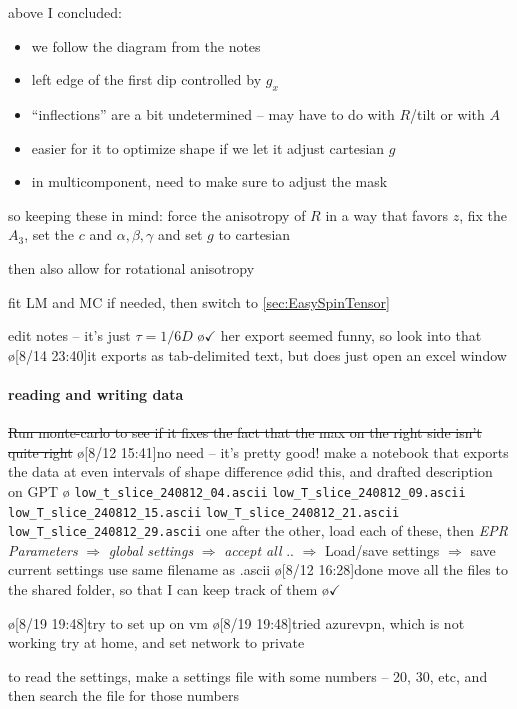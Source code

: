 above I concluded:
\begin{itemize}
    \item we follow the diagram from the notes
    \item left edge of the first dip controlled by $g_x$
    \item ``inflections'' are a bit undetermined -- may have to do with $R$/tilt or with $A$
    \item easier for it to optimize shape if we let it adjust cartesian $g$
    \item in multicomponent, need to make sure to adjust the mask
\end{itemize}
so keeping these in mind:
force the anisotropy of $R$ in a way that favors $z$,
fix the $A_3$,
set the $c$ and $\alpha,\beta,\gamma$
and set $g$ to cartesian

then also allow for rotational anisotropy

fit LM and MC if needed, then switch to \cref{sec:EasySpinTensor}

edit notes -- it's just $\tau=1/6D$
\o{$\checkmark$}
her export seemed funny, so look into that
\o[8/14 23:40]{it exports as tab-delimited text, but does just open an excel window}

\paragraph{reading and writing data}
\sout{Run monte-carlo to see if it fixes the fact that the max on the right side isn't quite right}
\o[8/12 15:41]{no need -- it's pretty good!}
make a notebook that exports the data at even intervals of shape difference
\o{did this, and drafted description on GPT}
\o{
    \texttt{low_t_slice_240812_04.ascii}
    \texttt{low_T_slice_240812_09.ascii}
    \texttt{low_T_slice_240812_15.ascii}
    \texttt{low_T_slice_240812_21.ascii}
    \texttt{low_T_slice_240812_29.ascii}
}
one after the other, load each of these, then \textit{EPR Parameters} $\Rightarrow$ \textit{global settings} $\Rightarrow$ \textit{accept all}
.. $\Rightarrow$ Load/save settings $\Rightarrow$ save current settings use same filename as .ascii
\o[8/12 16:28]{done}
move all the files to the shared folder, so that I can keep track of them
\o{$\checkmark$}
\begin{err}
    \o[8/19 19:48]{try to set up on vm}
    \o[8/19 19:48]{tried azurevpn, which is not working}
    try at home, and set network to private

\end{err}
to read the settings, make a settings file with some numbers -- 20, 30, etc, and then search the file for those numbers

